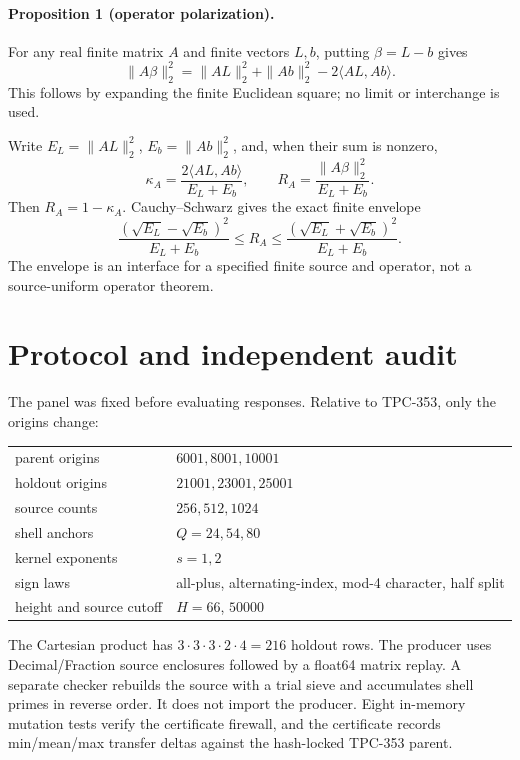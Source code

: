 \documentclass[10pt]{article}
\begin{document}
\paragraph{Proposition 1 (operator polarization).}
For any real finite matrix $A$ and finite vectors $L,b$, putting $\beta=L-b$
gives
\begin{equation}
 \|A\beta\|_2^2=\|AL\|_2^2+\|Ab\|_2^2-2\langle AL,Ab\rangle.
 \label{eq:polar}
\end{equation}
This follows by expanding the finite Euclidean square; no limit or
interchange is used.

Write $E_L=\|AL\|_2^2$, $E_b=\|Ab\|_2^2$, and, when their sum is nonzero,
\begin{equation}
 \kappa_A=\frac{2\langle AL,Ab\rangle}{E_L+E_b},\qquad
 R_A=\frac{\|A\beta\|_2^2}{E_L+E_b}.
 \label{eq:kappa}
\end{equation}
Then $R_A=1-\kappa_A$.  Cauchy--Schwarz gives the exact finite envelope
\begin{equation}
 \frac{(\sqrt{E_L}-\sqrt{E_b})^2}{E_L+E_b}
 \leq R_A\leq
 \frac{(\sqrt{E_L}+\sqrt{E_b})^2}{E_L+E_b}.
 \label{eq:cauchy}
\end{equation}
The envelope is an interface for a specified finite source and operator, not
a source-uniform operator theorem.

\section{Protocol and independent audit}

The panel was fixed before evaluating responses.  Relative to TPC-353, only the
origins change:
\begin{center}
\small
\begin{tabular}{ll}
\toprule
parent origins & $6001,8001,10001$\\
holdout origins & $21001,23001,25001$\\
source counts & $256,512,1024$\\
shell anchors & $Q=24,54,80$\\
kernel exponents & $s=1,2$\\
sign laws & all-plus, alternating-index, mod-4 character, half split\\
height and source cutoff & $H=66$, $50000$\\
\bottomrule
\end{tabular}
\end{center}
The Cartesian product has $3\cdot3\cdot3\cdot2\cdot4=216$ holdout rows.  The
producer uses Decimal/Fraction source enclosures followed by a float64 matrix
replay.  A separate checker rebuilds the source with a trial sieve and
accumulates shell primes in reverse order.  It does not import the producer.
Eight in-memory mutation tests verify the certificate firewall, and the
certificate records min/mean/max transfer deltas against the hash-locked
TPC-353 parent.
\end{document}
